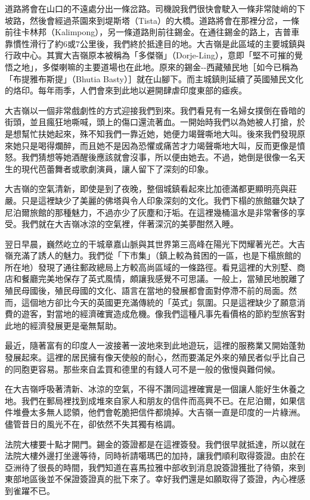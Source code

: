 道路將會在山口的不遠處分出一條岔路。司機說我們很快會駛入一條非常陡峭的下坡路，然後會經過茶園來到堤斯塔（Tista）的大橋。道路將會在那裡分岔，一條前往卡林邦（Kalimpong），另一條道路則前往錫金。在通往錫金的路上，吉普車靠慣性滑行了約6或7公里後，我們終於抵達目的地。大吉嶺是此區域的主要城鎮與行政中心。其實大吉嶺原本被稱為「多傑嶺」（Dorje-Ling），意即「堅不可摧的覺悟之地」，多傑喇嘛的主要道場也在此地。原來的錫金-\/-西藏殖民地［如今已稱為「布提雅布斯提」（Bhutia
Basty）］就在山腳下。而主城鎮則延續了英國殖民文化的烙印。每年雨季，人們會來到此地以避開肆虐印度東部的瘧疾。

大吉嶺以一個非常戲劇性的方式迎接我們到來。我們看見有一名婦女撲倒在昏暗的街頭，並且瘋狂地嘶喊，頭上的傷口還流著血。一開始時我們以為她被人打搶，於是想幫忙扶她起來，殊不知我們一靠近她，她便力竭聲嘶地大叫。後來我們發現原來她只是喝得爛醉，而且她不是因為恐懼或痛苦才力竭聲嘶地大叫，反而更像是憤怒。我們猜想等她酒醒後應該就會沒事，所以便由她去。不過，她倒是很像一名天生的現代芭蕾舞者或歌劇演員，讓人留下了深刻的印象。

大吉嶺的空氣清新，即使是到了夜晚，整個城鎮看起來比加德滿都更顯明亮與莊嚴。只是這裡缺少了美麗的佛塔與令人印象深刻的文化。我們下榻的旅館雖欠缺了尼泊爾旅館的那種魅力，不過亦少了灰塵和汙垢。在這裡幾桶溫水是非常奢侈的享受。我們就在大吉嶺冰涼的空氣裡，伴著深沉的美夢酣然入睡。

翌日早晨，巍然屹立的干城章嘉山脈與其世界第三高峰在陽光下閃耀著光芒。大吉嶺充滿了誘人的魅力。我們從「下市集」（鎮上較為貧困的一區，也是下榻旅館的所在地）發現了通往郵政總局上方較高尚區域的一條路徑。看見這裡的大別墅、商店和餐廳完美地保存了英式風情，頗讓我感覺不可思議。一般上，當殖民地脫離了殖民母國後，殖民母國的文化、語言在當地的發展都會面對停滯不前的局面。然而，這個地方卻比今天的英國更充滿傳統的「英式」氛圍。只是這裡缺少了願意消費的遊客，對當地的經濟確實造成危機。像我們這種凡事先看價格的節約型旅客對此地的經濟發展更是毫無幫助。

最近，隨著富有的印度人一波接著一波地來到此地遊玩，這裡的服務業又開始蓬勃發展起來。這裡的居民擁有像天使般的耐心，然而要滿足外來的殖民者似乎比自己的同胞更容易。那些來自孟買和德里的有錢人可不是一般的傲慢與難伺候。

在大吉嶺呼吸著清新、冰涼的空氣，不得不讚同這裡確實是一個讓人能好生休養之地。我們在郵局裡找到成堆來自家人和朋友的信件而高興不已。在尼泊爾，如果信件堆疊太多無人認領，他們會乾脆把信件都燒掉。大吉嶺一直是印度的一片綠洲。儘管昔日的風光不在，卻依然不失其獨有格調。

法院大樓要十點才開門。錫金的簽證都是在這裡簽發。我們很早就抵達，所以就在法院大樓外邊打坐邊等待，同時祈請噶瑪巴的加持，讓我們順利取得簽證。由於在亞洲待了很長的時間，我們知道在喜馬拉雅中部收到消息說簽證獲批了待領，來到東部地區後並不保證簽證真的批下來了。幸好我們還是如願取得了簽證，內心裡感到雀躍不已。

